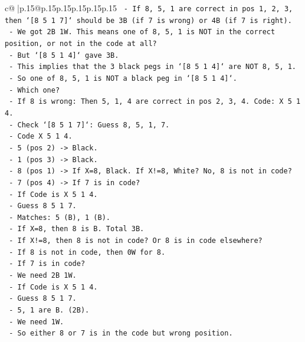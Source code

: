 \documentclass{article}
\begin{document}
{\begin{supertabular}{c@{$\;$}|p{.15\linewidth}@{}p{.15\linewidth}p{.15\linewidth}p{.15\linewidth}p{.15\linewidth}p{.15\linewidth}}
{{{\texttt{        {-} If 8, 5, 1 are correct in pos 1, 2, 3, then `{[}8 5 1 7{]}` should be 3B (if 7 is wrong) or 4B (if 7 is right).} \\
\texttt{        {-} We got 2B 1W. This means one of 8, 5, 1 is NOT in the correct position, or not in the code at all?} \\
\texttt{        {-} But `{[}8 5 1 4{]}` gave 3B.} \\
\texttt{        {-} This implies that the 3 black pegs in `{[}8 5 1 4{]}` are NOT 8, 5, 1.} \\
\texttt{        {-} So one of 8, 5, 1 is NOT a black peg in `{[}8 5 1 4{]}`.} \\
\texttt{        {-} Which one?} \\
\texttt{        {-} If 8 is wrong: Then 5, 1, 4 are correct in pos 2, 3, 4. Code: X 5 1 4.} \\
\texttt{          {-} Check `{[}8 5 1 7{]}`: Guess 8, 5, 1, 7.} \\
\texttt{          {-} Code X 5 1 4.} \\
\texttt{          {-} 5 (pos 2) {-}> Black.} \\
\texttt{          {-} 1 (pos 3) {-}> Black.} \\
\texttt{          {-} 8 (pos 1) {-}> If X=8, Black. If X!=8, White? No, 8 is not in code?} \\
\texttt{          {-} 7 (pos 4) {-}> If 7 is in code?} \\
\texttt{          {-} If Code is X 5 1 4.} \\
\texttt{          {-} Guess 8 5 1 7.} \\
\texttt{          {-} Matches: 5 (B), 1 (B).} \\
\texttt{          {-} If X=8, then 8 is B. Total 3B.} \\
\texttt{          {-} If X!=8, then 8 is not in code? Or 8 is in code elsewhere?} \\
\texttt{          {-} If 8 is not in code, then 0W for 8.} \\
\texttt{          {-} If 7 is in code?} \\
\texttt{          {-} We need 2B 1W.} \\
\texttt{          {-} If Code is X 5 1 4.} \\
\texttt{          {-} Guess 8 5 1 7.} \\
\texttt{          {-} 5, 1 are B. (2B).} \\
\texttt{          {-} We need 1W.} \\
\texttt{          {-} So either 8 or 7 is in the code but wrong position.} \\
}}}
\end{supertabular}}
\end{document}
